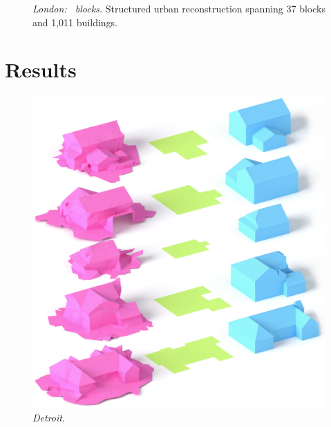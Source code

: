 


\begin{figure}[t!]
    \centering
    \def\svgwidth{\linewidth}  
    
    \vspace*{-.1in}
    \caption{{\it London: \LondonOC\ blocks.} Structured urban reconstruction spanning 37 blocks and 1,011 buildings. }
    \label{fig:results_london_big}
    \vspace{1cm}
\end{figure}

\section{Results}
\label{sec:results}


\begin{figure}[b!]
  \centering
  \vspace{-0.6cm}
    \includegraphics[width=\columnwidth]{../images/detroit/detroit.jpg}
    \caption{
    {\it Detroit}. }
    \label{fig:detroitResults}
     \vspace{0.6cm}
\end{figure}

